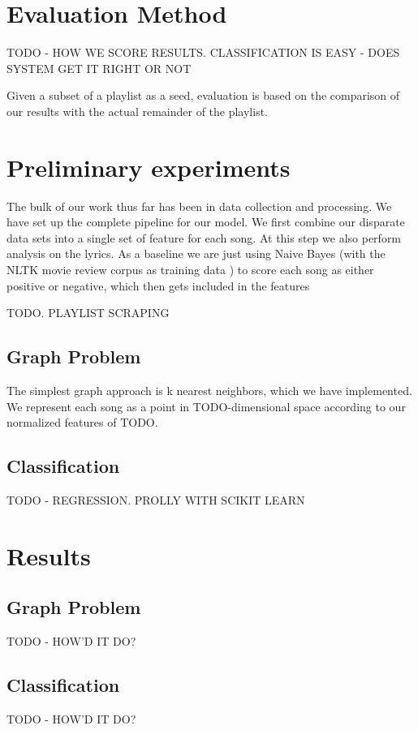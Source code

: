 \documentclass[10pt,journal,compsoc]{IEEEtran}
\begin{document}
\section{Evaluation Method}
TODO - HOW WE SCORE RESULTS. CLASSIFICATION IS EASY - DOES SYSTEM GET IT RIGHT OR NOT

Given a subset of a playlist as a seed, evaluation is based on the comparison of our results with the actual remainder of the playlist.

\section{Preliminary experiments}
The bulk of our work thus far has been in data collection and processing. We have set up the complete pipeline for our model. We first combine our disparate data sets into a single set of feature for each song. At this step we also perform analysis on the lyrics. As a baseline we are just using Naive Bayes (with the NLTK movie review corpus as training data \cite{nltk}) to score each song as either positive or negative, which then gets included in the features

TODO. PLAYLIST SCRAPING

\subsection{Graph Problem}
The simplest graph approach is k nearest neighbors, which we have implemented. We represent each song as a point in TODO-dimensional space according to our normalized features of TODO.

\subsection{Classification}
TODO - REGRESSION. PROLLY WITH SCIKIT LEARN

\section{Results}

\subsection{Graph Problem}
TODO - HOW'D IT DO?

\subsection{Classification}
TODO - HOW'D IT DO?
\end{document}
